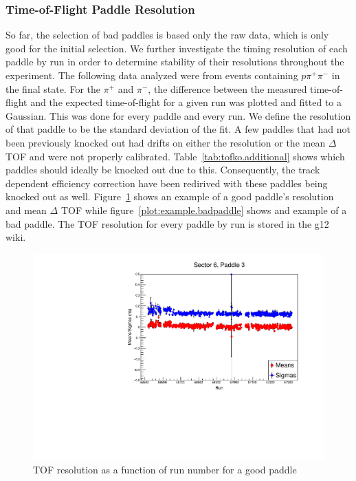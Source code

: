 \subsubsection{\label{sec:calib.tof.resolution}Time-of-Flight Paddle Resolution}
So far, the selection of bad paddles is based only the raw data, which is only good for the initial selection. We further investigate the timing resolution of each paddle by run in order to determine stability of their resolutions throughout the experiment. The following data analyzed were from events containing $p \pi^{+} \pi^{-}$ in the final state. For the $\pi^{+}$ and $\pi^{-}$, the difference between the measured time-of-flight and the expected time-of-flight for a given run was plotted and fitted to a Gaussian. This was done for every paddle and every run. We define the resolution of that paddle to be the standard deviation of the fit.
A few paddles that had not been previously knocked out had drifts on either the resolution or the mean $\Delta$ TOF and were not properly calibrated. Table~\ref{tab:tofko.additional} shows which paddles should ideally be knocked out due to this.  Consequently, the track dependent efficiency correction have been redirived with these paddles being knocked out as well.  Figure~\ref{plot:example.goodpaddle} shows an example of a good paddle's resolution and mean $\Delta$ TOF while figure~\ref{plot:example.badpaddle} shows and example of a bad paddle. The TOF resolution for every paddle by run is stored in the g12 wiki. 


 



\begin{figure}\begin{center}
      \includegraphics[width=0.4\columnwidth,angle=270]{figures/calib/tof/goodexample.pdf}
   \caption{\label{plot:example.goodpaddle}TOF resolution as a function of run number for a good paddle}
\end{center}\end{figure}

